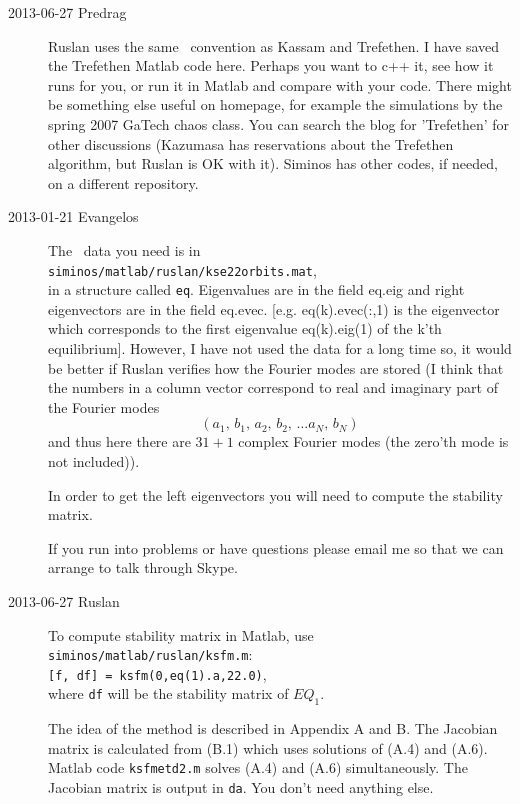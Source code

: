 \begin{description}
\item[2013-06-27 Predrag]
Ruslan uses the same \KSe\ convention as Kassam and
Trefethen. I have saved the Trefethen Matlab code
 {here}. Perhaps
you want to c++ it, see how it runs for you, or run it in Matlab and
compare with your code. There might be something else useful on
 homepage,
for example the simulations by the spring 2007 GaTech chaos class.
You can search the blog for 'Trefethen' for other discussions
(Kazumasa has reservations about the Trefethen algorithm,
but Ruslan is OK with it).
Siminos has other codes, if needed, on a different repository.

\item[2013-01-21 Evangelos] The \KS\ data you need is in \\
\texttt{siminos/matlab/ruslan/kse22orbits.mat},
\\
in a structure called \texttt{eq}.
Eigenvalues are in the field eq.eig and right
eigenvectors are in the field eq.evec. [e.g. eq(k).evec(:,1) is the
eigenvector which corresponds to the first eigenvalue eq(k).eig(1) of
the k'th equilibrium]. However, I have not used the data for a long
time so, it would be better if Ruslan verifies how the Fourier modes
are stored (I think that the numbers in a column vector correspond to
real and imaginary part of the Fourier modes
\[
 (a_1,\, b_1,\, a_2,\, b_2,\, \ldots a_N,\, b_N)
\]
and thus here there are $31+1$ complex Fourier modes (the zero'th mode
is not included)).

In order to get the left eigenvectors you will need to compute the
stability matrix.

If you run into problems or have questions please email me so that we
can arrange to talk through Skype.


\item[2013-06-27 Ruslan] To compute stability matrix in Matlab, use
\\
\texttt{siminos/matlab/ruslan/ksfm.m}:
\\ {\tt [f, df] = ksfm(0,eq(1).a,22.0)},
\\where {\tt df} will be the stability matrix of $EQ_1$.

The idea of the method is described in  Appendix A and
B.  The Jacobian matrix is calculated from (B.1) which uses solutions
of (A.4) and (A.6).  Matlab code {\tt ksfmetd2.m} solves (A.4) and
(A.6) simultaneously.  The Jacobian matrix is output in {\tt da}.
You don't need anything else.



\end{description}
